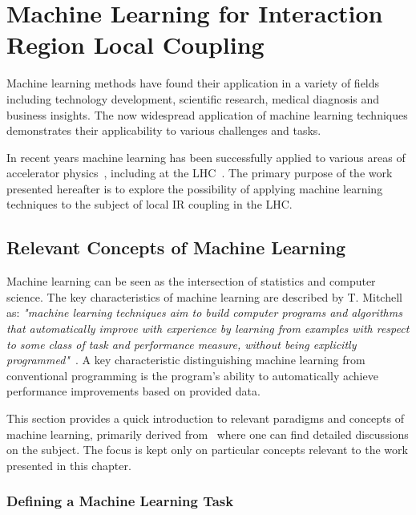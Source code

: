\chapter{Machine Learning for Interaction Region Local Coupling} %
\label{chapter:ml_local_coupling} %

Machine learning methods have found their application in a variety of fields including technology development, scientific research, medical diagnosis and business insights.
The now widespread application of machine learning techniques demonstrates their applicability to various challenges and tasks.

In recent years machine learning has been successfully applied to various areas of accelerator physics~\cite{}, including at the LHC~\cite{PRAB:Fol:Detection_Faulty_BPMs,EPJP:Fol:Supervised_Learning_Reconstruction_Magnet_Errors,PHD:Fol:Application_ML_Beam_Optics}.
The primary purpose of the work presented hereafter is to explore the possibility of applying machine learning techniques to the subject of local IR coupling in the LHC.

\section{Relevant Concepts of Machine Learning}

Machine learning can be seen as the intersection of statistics and computer science.
The key characteristics of machine learning are described by T. Mitchell as: \textit{"machine learning techniques aim to build computer programs and algorithms that automatically improve with experience by learning from examples with respect to some class of task and performance measure, without being explicitly programmed"}~\cite{BOOK:Mitchell:Machine_Learning}.
A key characteristic distinguishing machine learning from conventional programming is the program's ability to automatically achieve performance improvements based on provided data.

This section provides a quick introduction to relevant paradigms and concepts of machine learning, primarily derived from~\cite{BOOK:Mitchell:Machine_Learning,BOOK:Hastie:Elements_Statistical_Learning} where one can find detailed discussions on the subject.
The focus is kept only on particular concepts relevant to the work presented in this chapter.

\subsection{Defining a Machine Learning Task}

